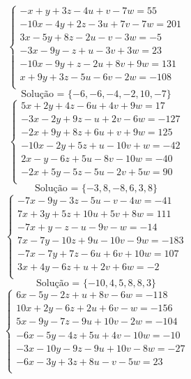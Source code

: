 \documentclass[12pt,oneside,a4paper]{article}
\begin{document}
\vspace{\baselineskip}
\begin{equation*}
\begin{cases}
-x+y+3z-4u+v-7w=55 \\
-10x-4y+2z-3u+7v-7w=201 \\
3x-5y+8z-2u-v-3w=-5 \\
-3x-9y-z+u-3v+3w=23 \\
-10x-9y+z-2u+8v+9w=131 \\
x+9y+3z-5u-6v-2w=-108 \\
\end{cases}
\end{equation*}
\begin{equation*}
\text{Solução = }\{-6,-6,-4,-2,10,-7\}
\end{equation*}
\vspace{\baselineskip}
\begin{equation*}
\begin{cases}
5x+2y+4z-6u+4v+9w=17 \\
-3x-2y+9z-u+2v-6w=-127 \\
-2x+9y+8z+6u+v+9w=125 \\
-10x-2y+5z+u-10v+w=-42 \\
2x-y-6z+5u-8v-10w=-40 \\
-2x+5y-5z-5u-2v+5w=90 \\
\end{cases}
\end{equation*}
\begin{equation*}
\text{Solução = }\{-3,8,-8,6,3,8\}
\end{equation*}
\vspace{\baselineskip}
\begin{equation*}
\begin{cases}
-7x-9y-3z-5u-v-4w=-41 \\
7x+3y+5z+10u+5v+8w=111 \\
-7x+y-z-u-9v-w=-14 \\
7x-7y-10z+9u-10v-9w=-183 \\
-7x-7y+7z-6u+6v+10w=107 \\
3x+4y-6z+u+2v+6w=-2 \\
\end{cases}
\end{equation*}
\begin{equation*}
\text{Solução = }\{-10,4,5,8,8,3\}
\end{equation*}
\vspace{\baselineskip}
\begin{equation*}
\begin{cases}
6x-5y-2z+u+8v-6w=-118 \\
10x+2y-6z+2u+6v-w=-156 \\
5x-9y-7z-9u+10v-2w=-104 \\
-6x-5y-4z+5u+4v-10w=-10 \\
-3x-10y-9z-9u+10v-8w=-27 \\
-6x-3y+3z+8u-v-5w=23 \\
\end{cases}
\end{equation*}
\end{document}
